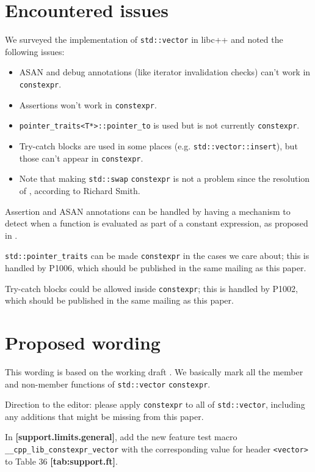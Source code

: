 \documentclass{wg21}
\newcommand{\cc}[1]{\texttt{#1}}
\begin{document}
\section{Encountered issues}
We surveyed the implementation of \cc{std::vector} in libc++ and noted the
following issues:
\begin{itemize}
  \item ASAN and debug annotations (like iterator invalidation checks) can't
        work in \cc{constexpr}.
  \item Assertions won't work in \cc{constexpr}.
  \item \cc{pointer_traits<T*>::pointer_to} is used but is not currently
        \cc{constexpr}.
  \item Try-catch blocks are used in some places (e.g. \cc{std::vector::insert}),
        but those can't appear in \cc{constexpr}.
  \item Note that making \cc{std::swap} \cc{constexpr} is not a problem since
        the resolution of \cite{P0859R0}, according to Richard Smith.
\end{itemize}

Assertion and ASAN annotations can be handled by having a mechanism to detect
when a function is evaluated as part of a constant expression, as proposed in
\cite{P0595R0}.

\cc{std::pointer_traits} can be made \cc{constexpr} in the cases we care about;
this is handled by P1006, which should be published in the same mailing as this
paper.

Try-catch blocks could be allowed inside \cc{constexpr}; this is handled by
P1002, which should be published in the same mailing as this paper.


\section{Proposed wording}
This wording is based on the working draft \cite{N4727}. We basically mark
all the member and non-member functions of \cc{std::vector} \cc{constexpr}.

Direction to the editor: please apply \cc{constexpr} to all of \cc{std::vector},
including any additions that might be missing from this paper.

In \textbf{[support.limits.general]}, add the new feature test macro
\cc{__cpp_lib_constexpr_vector} with the corresponding value for header
\cc{<vector>} to Table 36 \textbf{[tab:support.ft]}.
\end{document}
